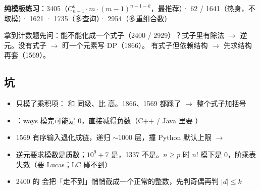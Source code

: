 \textbf{纯模板练习}：3405（$C_{n-1}^k \cdot m \cdot (m-1)^{n-1-k}$，最推荐）· 62 / 1641（热身，不取模）· 1621 · 1735（多查询）· 2954（多重组合数）

\begin{principle}
拿到计数题先问：能不能化成一个式子（2400 / 2929）？式子里有除法 $\to$ 逆元。没有式子 $\to$ 盯一个元素写 DP（1866）。
有式子但依赖结构 $\to$ 先求结构再套（1569）。
\end{principle}

\subsection{坑}
\begin{itemize}
\item {} 只模了乘积项：\code{\%} 和 \code{*} 同级、比 \code{+} 高。1866、1569 都踩了 $\to$ 整个式子加括号
\item {}：ways 模完可能是 0，直接减得负数（C++ / Java 里要 ）
\item 1569 有序输入退化成链，递归 $\sim$1000 层，撞 Python 默认上限 $\to$ 
\item 逆元要求模数是质数；$10^9+7$ 是，1337 不是。$n \ge p$ 时 $n!$ 模下是 0，阶乘表失效（要 Lucas；LC 碰不到）
\item 2400 的 \code{//} 会把「走不到」悄悄截成一个正常的整数，先判奇偶再判 $|d| \le k$
\end{itemize}

